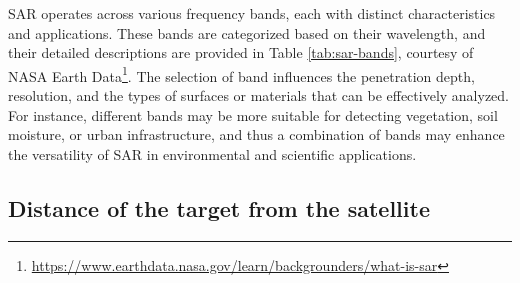 \documentclass[
  12 pt,
]{Nemilov}
\begin{document}
SAR operates across various frequency bands, each with distinct characteristics and applications. These bands are categorized based on their wavelength, and their detailed descriptions are provided in Table \ref{tab:sar-bands}, courtesy of NASA Earth Data\footnote{\url{https://www.earthdata.nasa.gov/learn/backgrounders/what-is-sar}}. The selection of band influences the penetration depth, resolution, and the types of surfaces or materials that can be effectively analyzed. For instance, different bands may be more suitable for detecting vegetation, soil moisture, or urban infrastructure, and thus a combination of bands may enhance the versatility of SAR in environmental and scientific applications.

\begin{table}[!h]
\centering
\caption{\label{tab:sar-bands}Band information for SAR}
\centering
{}
\end{table}

\subsection{Distance of the target from the satellite}\label{distance-of-the-target-from-the-satellite}
\end{document}
